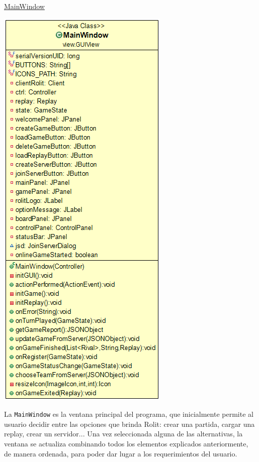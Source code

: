 \documentclass[12pt,a4paper,openright]{book}
\theoremstyle{break}
\begin{document}
\newpage

\underline{MainWindow}
\begin{center}
\includegraphics[scale=0.55]{mainwindowuml.png}
\end{center}

La \texttt{MainWindow} es la ventana principal del programa, que inicialmente permite al usuario decidir entre las opciones que brinda Rolit: crear una partida, cargar una replay, crear un servidor... Una vez seleccionada alguna de las alternativas, la ventana se actualiza combinando todos los elementos explicados anteriormente, de manera ordenada, para poder dar lugar a los requerimientos del usuario.
\end{document}
